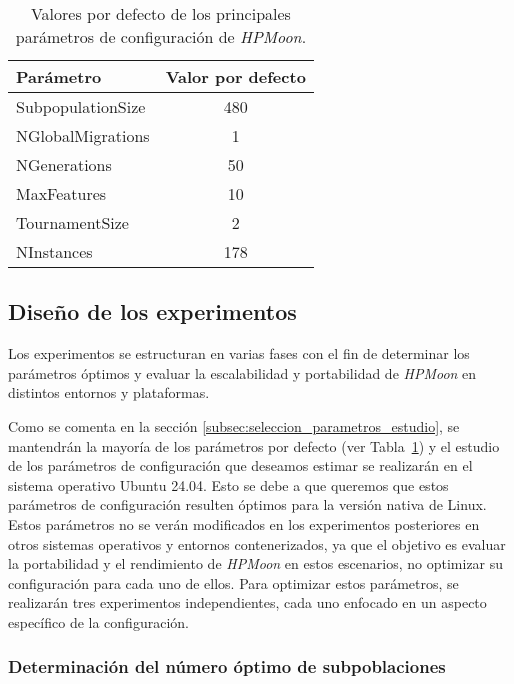 \begin{table}[htbp]
    \centering
    \begin{tabular}{|l|c|}
        \hline
        \textbf{Parámetro} & \textbf{Valor por defecto} \\
        \hline
        SubpopulationSize  & 480                        \\
        NGlobalMigrations  & 1                          \\
        NGenerations       & 50                         \\
        MaxFeatures        & 10                         \\
        TournamentSize     & 2                          \\
        NInstances         & 178                        \\
        \hline
    \end{tabular}
    \caption{Valores por defecto de los principales parámetros de configuración de \textit{HPMoon}.}
    \label{tab:HPMoon_default_params}
\end{table}

\subsection{Diseño de los experimentos}\label{subsec:diseno_experimentos_detallado}

Los experimentos se estructuran en varias fases con el fin de determinar los parámetros óptimos y evaluar la escalabilidad y portabilidad de \textit{HPMoon} en distintos entornos y plataformas.

Como se comenta en la sección \ref{subsec:seleccion_parametros_estudio}, se mantendrán la mayoría de los parámetros por defecto (ver Tabla~\ref{tab:HPMoon_default_params}) y el estudio de los parámetros de configuración que deseamos estimar se realizarán en el sistema operativo Ubuntu 24.04. Esto se debe a que queremos que estos parámetros de configuración resulten óptimos para la versión nativa de Linux. Estos parámetros no se verán modificados en los experimentos posteriores en otros sistemas operativos y entornos contenerizados, ya que el objetivo es evaluar la portabilidad y el rendimiento de \textit{HPMoon} en estos escenarios, no optimizar su configuración para cada uno de ellos. Para optimizar estos parámetros, se realizarán tres experimentos independientes, cada uno enfocado en un aspecto específico de la configuración.

\subsubsection{Determinación del número óptimo de subpoblaciones}\label{subsubsec:determinacion_subpoblaciones}

